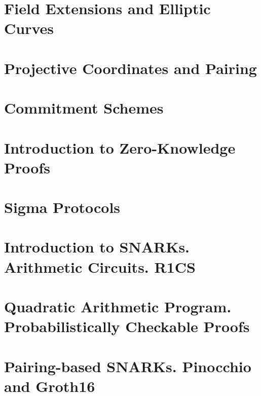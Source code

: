 \documentclass{zkdl-template-105x135-nohead}
\begin{document}
    \section{Field Extensions and Elliptic Curves}

    \label{section:field_extensions}

    \section{Projective Coordinates and Pairing}

    

    \section{Commitment Schemes} \label{section:commitments}

     

    \section{Introduction to Zero-Knowledge Proofs} \label{section:intro-zk}

    

    \section{Sigma Protocols} \label{section:sigma}

    

    \section[Arithmetic Circuits. R1CS]{Introduction to SNARKs. Arithmetic Circuits. R1CS} \label{section:r1cs}

    \label{secation:circuits}

    \section[Quadratic Arithmetic Program]{Quadratic Arithmetic Program. Probabilistically Checkable Proofs} \label{section:qap}

    

    \section[Pairing-based SNARKs]{Pairing-based SNARKs. Pinocchio and Groth16} \label{section:groth16}
\end{document}
